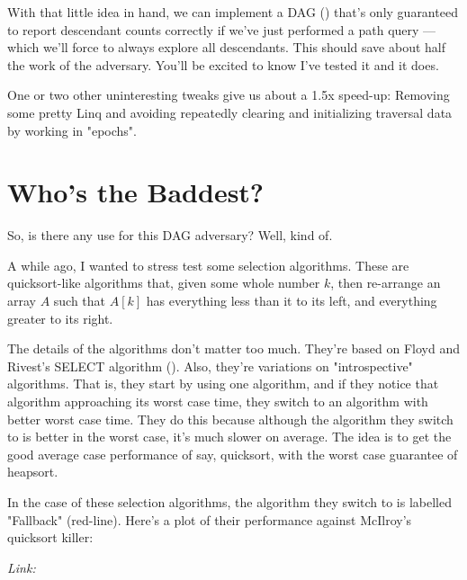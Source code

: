 \documentclass[11pt]{article}
\begin{document}
With that little idea in hand, we can implement a DAG (\texttt{}) that's only guaranteed to report descendant counts correctly if we've just performed a path query --- which we'll force to always explore all descendants. This should save about half the work of the adversary. You'll be excited to know I've tested it and it does.

One or two other uninteresting tweaks give us about a 1.5x speed-up: Removing some pretty Linq and avoiding repeatedly clearing and initializing traversal data by working in "epochs".
\section{Who's the Baddest?}

So, is there any use for this DAG adversary? Well, kind of.

A while ago, I wanted to stress test some selection algorithms. These are quicksort-like algorithms that, given some whole number $k$, then re-arrange an array $A$ such that $A[k]$ has everything less than it to its left, and everything greater to its right.

The details of the algorithms don't matter too much. They're based on Floyd and Rivest's SELECT algorithm (\texttt{}). Also, they're variations on "introspective" algorithms. That is, they start by using one algorithm, and if they notice that algorithm approaching its worst case time, they switch to an algorithm with better worst case time. They do this because although the algorithm they switch to is better in the worst case, it's much slower on average. The idea is to get the good average case performance of say, quicksort, with the worst case guarantee of heapsort.

In the case of these selection algorithms, the algorithm they switch to is labelled "Fallback" (red-line). Here's a plot of their performance against McIlroy's quicksort killer:

\begin{center}\end{center}

\textit{Link: }\texttt{}
\end{document}
